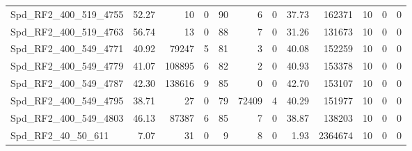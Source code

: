 \begin{longtable}[c]{@{}lrrrrrrrrrrr@{}}
Spd\_RF2\_400\_519\_4755      & 52.27                  & 10                      & 0                       & 90                     & 6                       & 0                       & 37.73                   & 162371                   & 10                       & 0                        & 0                        \\
Spd\_RF2\_400\_519\_4763      & 56.74                  & 13                      & 0                       & 88                     & 7                       & 0                       & 31.26                   & 131673                   & 10                       & 0                        & 0                        \\
Spd\_RF2\_400\_549\_4771      & 40.92                  & 79247                   & 5                       & 81                     & 3                       & 0                       & 40.08                   & 152259                   & 10                       & 0                        & 0                        \\
Spd\_RF2\_400\_549\_4779      & 41.07                  & 108895                  & 6                       & 82                     & 2                       & 0                       & 40.93                   & 153378                   & 10                       & 0                        & 0                        \\
Spd\_RF2\_400\_549\_4787      & 42.30                  & 138616                  & 9                       & 85                     & 0                       & 0                       & 42.70                   & 153107                   & 10                       & 0                        & 0                        \\
Spd\_RF2\_400\_549\_4795      & 38.71                  & 27                      & 0                       & 79                     & 72409                   & 4                       & 40.29                   & 151977                   & 10                       & 0                        & 0                        \\
Spd\_RF2\_400\_549\_4803      & 46.13                  & 87387                   & 6                       & 85                     & 7                       & 0                       & 38.87                   & 138203                   & 10                       & 0                        & 0                        \\
Spd\_RF2\_40\_50\_611         & 7.07                   & 31                      & 0                       & 9                      & 8                       & 0                       & 1.93                    & 2364674                  & 10                       & 0                        & 0                        \\

\end{longtable}

